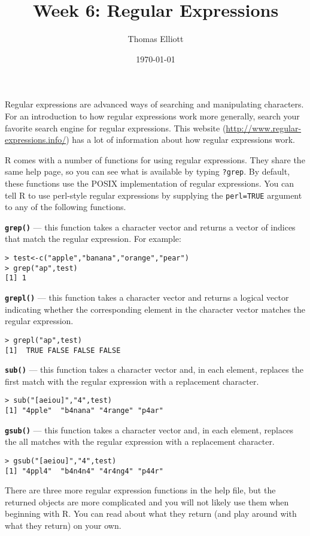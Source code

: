 \documentclass[12pt, oneside]{amsart}   	%
\title{Week 6: Regular Expressions}
\author{Thomas Elliott}
\date{\today}							%
\begin{document}
\maketitle

Regular expressions are advanced ways of searching and manipulating characters. For an introduction to how regular expressions work more generally, search your favorite search engine for regular expressions. This website (\url{http://www.regular-expressions.info/}) has a lot of information about how regular expressions work.

R comes with a number of functions for using regular expressions. They share the same help page, so you can see what is available by typing \texttt{?grep}. By default, these functions use the POSIX implementation of regular expressions. You can tell R to use perl-style regular expressions by supplying the \texttt{perl=TRUE} argument to any of the following functions.

\textbf{\texttt{grep()}} --- this function takes a character vector and returns a vector of indices that match the regular expression. For example:

\begin{verbatim}
> test<-c("apple","banana","orange","pear")
> grep("ap",test)
[1] 1
\end{verbatim}

\textbf{\texttt{grepl()}} --- this function takes a character vector and returns a logical vector indicating whether the corresponding element in the character vector matches the regular expression.

\begin{verbatim}
> grepl("ap",test)
[1]  TRUE FALSE FALSE FALSE
\end{verbatim}

\textbf{\texttt{sub()}} --- this function takes a character vector and, in each element, replaces the first match with the regular expression with a replacement character.

\begin{verbatim}
> sub("[aeiou]","4",test)
[1] "4pple"  "b4nana" "4range" "p4ar" 
\end{verbatim}

\textbf{\texttt{gsub()}} --- this function takes a character vector and, in each element, replaces the all matches with the regular expression with a replacement character.

\begin{verbatim}
> gsub("[aeiou]","4",test)
[1] "4ppl4"  "b4n4n4" "4r4ng4" "p44r" 
\end{verbatim}

There are three more regular expression functions in the help file, but the returned objects are more complicated and you will not likely use them when beginning with R. You can read about what they return (and play around with what they return) on your own.
\end{document}
